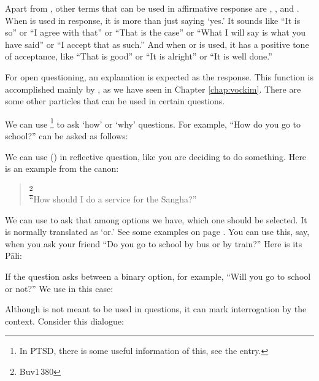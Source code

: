 Apart from , other terms that can be used in affirmative response are , , and . When  is used in response, it is more than just saying `yes.' It sounds like ``It is so'' or ``I agree with that'' or ``That is the case'' or ``What I will say is what you have said'' or ``I accept that as such.'' And when  or  is used, it has a positive tone of acceptance, like ``That is good'' or ``It is alright'' or ``It is well done.''

For open questioning, an explanation is expected as the response. This function is accomplished mainly by , as we have seen in Chapter \ref{chap:vockim}. There are some other particles that can be used in certain questions.

We can use \footnote{In PTSD, there is some useful information of this, see the entry.} to ask `how' or `why' questions. For example, ``How do you go to school?'' can be asked as follows:


We can use  () in reflective question, like you are deciding to do something. Here is an example from the canon:

\begin{quote}
\footnote{Buv1\,380}\\
``How should I do a service for the Sangha?''
\end{quote}

We can use  to ask that among options we have, which one should be selected. It is normally translated as `or.' See some examples on page \pageref{nip:udaahu}. You can use this, say, when you ask your friend ``Do you go to school by bus or by train?'' Here is its P\=ali:


If the question asks between a binary option, for example, ``Will you go to school or not?'' We use  in this case:


Although  is not meant to be used in questions, it can mark interrogation by the context. Consider this dialogue:

